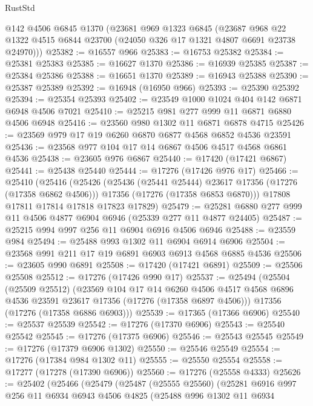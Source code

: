 \begin{lexlean}{RustStd}
\begin{coremodule}
    @142
    @4506
    @6845
    @1370
    (@23681
      @969
      @1323
      @6845
      (@23687 @968 @22 @1322 @4515 @6844 @23700 (@24050 @326 @17 @1321 @4807 @6691 @23738 @24970)))
@25382 := @16557 @966
@25383 := @16753 @25382
@25384 := @25381 @25383
@25385 := @16627 @1370
@25386 := @16939 @25385
@25387 := @25384 @25386
@25388 := @16651 @1370
@25389 := @16943 @25388
@25390 := @25387 @25389
@25392 := @16948 (@16950 @966)
@25393 := @25390 @25392
@25394 := @25354 @25393
@25402 := @23549 @1000 @1024 @404 @142 @6871 @6948 @4506 @7021
@25410 := @25215 @981 @277 @999 @11 @6871 @6880 @4506 @6948
@25416 := @23560 @980 @1302 @11 @6871 @6878 @4715
@25426 := @23569 @979 @17 @19 @6260 @6870 @6877 @4568 @6852 @4536 @23591
@25436 := @23568 @977 @104 @17 @14 @6867 @4506 @4517 @4568 @6861 @4536
@25438 := @23605 @976 @6867
@25440 := @17420 (@17421 @6867)
@25441 := @25438 @25440
@25444 := @17276 (@17426 @976 @17)
@25466 := @25410
    (@25416
      (@25426
        (@25436 (@25441 @25444) @23617 @17356 (@17276 (@17358 @6862 @4506)))
        @17356
        (@17276 (@17358 @6853 @6870)))
      @17808
      @17811
      @17814
      @17818
      @17823
      @17829)
@25479 := @25281 @6880 @277 @999 @11 @4506 @4877 @6904 @6946 (@25339 @277 @11 @4877 @24405)
@25487 := @25215 @994 @997 @256 @11 @6904 @6916 @4506 @6946
@25488 := @23559 @984
@25494 := @25488 @993 @1302 @11 @6904 @6914 @6906
@25504 := @23568 @991 @211 @17 @19 @6891 @6903 @6913 @4568 @6885 @4536
@25506 := @23605 @990 @6891
@25508 := @17420 (@17421 @6891)
@25509 := @25506 @25508
@25512 := @17276 (@17426 @990 @17)
@25537 := @25494
    (@25504
      (@25509 @25512)
      (@23569
        @104
        @17
        @14
        @6260
        @4506
        @4517
        @4568
        @6896
        @4536
        @23591
        @23617
        @17356
        (@17276 (@17358 @6897 @4506)))
      @17356
      (@17276 (@17358 @6886 @6903)))
@25539 := @17365 (@17366 @6906)
@25540 := @25537 @25539
@25542 := @17276 (@17370 @6906)
@25543 := @25540 @25542
@25545 := @17276 (@17375 @6906)
@25546 := @25543 @25545
@25549 := @17276 (@17379 @6906 @1302)
@25550 := @25546 @25549
@25554 := @17276 (@17384 @984 @1302 @11)
@25555 := @25550 @25554
@25558 := @17277 (@17278 (@17390 @6906))
@25560 := @17276 (@25558 @4333)
@25626 := @25402
    (@25466
      (@25479
        (@25487
          (@25555 @25560)
          (@25281
            @6916
            @997
            @256
            @11
            @6934
            @6943
            @4506
            @4825
            (@25488
              @996
              @1302
              @11
              @6934

\end{coremodule}
\end{lexlean}
